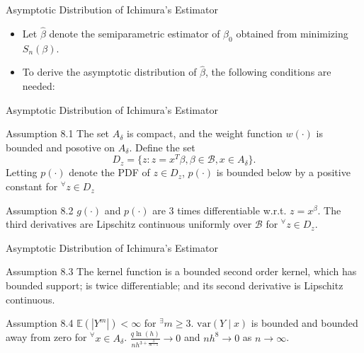 \documentclass[xcolor=svgnames,dvipdfmx,cjk]{beamer}
\theoremstyle{example}
\def\var{\text{var}}
\def\E{\mathbb{E}}
\begin{document}
\begin{frame}{Asymptotic Distribution of Ichimura's Estimator}
  \begin{itemize}
    \item Let $\hat{\beta}$ denote the semiparametric estimator of $\beta_0$
          obtained from minimizing $S_n(\beta)$.
    \item To derive the asymptotic distribution of $\hat{\beta}$, the following conditions are needed:
  \end{itemize}
  \end{frame}
  
  
  \begin{frame}{Asymptotic Distribution of Ichimura's Estimator}
    \begin{itembox}[l]{Assumption 8.1}
      The set $A_\delta$ is compact, 
      and the weight function $w(\cdot)$ is bounded and posotive on $A_\delta$.
      Define the set 
      \[D_z = \{ z: z=x^{T}\beta, \beta \in \mathcal{B}, x \in A_\delta \}.\]
      Letting $p(\cdot)$ denote the PDF of $z \in D_z$, 
      $p(\cdot)$ is bounded below by a positive constant for $^\forall z \in D_z$
    \end{itembox}
    \begin{itembox}[l]{Assumption 8.2}
      $g(\cdot)$ and $p(\cdot)$ are 3 times differentiable w.r.t. $z=x^{\beta}$.
      The third derivatives are Lipschitz continuous uniformly over $\mathcal{B}$
      for $^{\forall} z \in D_z$. 
    \end{itembox}
  \end{frame}
  
  \begin{frame}{Asymptotic Distribution of Ichimura's Estimator}
    \begin{itembox}[l]{Assumption 8.3} 
      The kernel function is a bounded second order kernel, which has bounded support;
      is twice differentiable; 
      and its second derivative is Lipschitz continuous.
    \end{itembox}
    \begin{itembox}[l]{Assumption 8.4}
      $\E(|Y^m|) < \infty$ for $^{\exists} m \geq 3$.
      $\var(Y \mid x)$ is bounded and 
      bounded away from zero for $^{\forall} x \in A_\delta$. 
      $\frac{q \ln(h)}{nh^{3 + \frac{3}{m-1}}} \to 0$ and 
      $ nh^8 \to 0$ as $n \to \infty$.
    \end{itembox}
  \end{frame}
  
\end{document}
